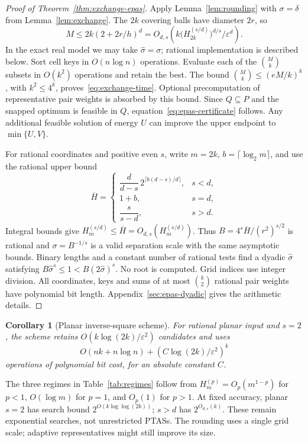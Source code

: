\documentclass[a4paper,12pt]{article}
\newtheorem{corollary}[theorem]{Corollary}
\numberwithin{equation}{section}
\begin{document}
\begin{proof}[Proof of Theorem~\ref{thm:exchange-epas}]
Apply Lemma~\ref{lem:rounding} with $\sigma=\delta$ from Lemma~\ref{lem:exchange}. The $2k$
covering balls have diameter $2r$, so
\[
 M\le2k(2+2r/h)^d
 =O_{d,s}\!\left(k\bigl(H_{2k}^{(s/d)}\bigr)^{d/s}/\varepsilon^d\right).
\]
In the exact real model we may take $\widehat\sigma=\sigma$; rational implementation is described
below. Sort cell keys in $O(n\log n)$ operations. Evaluate each of the $\binom Mk$ subsets in
$O(k^2)$ operations and retain the best. The bound $\binom Mk\le(eM/k)^k$, with $k^2\le4^k$,
proves~\eqref{eq:exchange-time}. Optional precomputation of representative pair weights is
absorbed by this bound. Since $Q\subseteq P$ and the snapped optimum is feasible in $Q$,
equation~\eqref{eq:epas-certificate} follows. Any additional feasible solution of energy $U$ can
improve the upper endpoint to $\min\{U,V\}$.

For rational coordinates and positive even $s$, write $m=2k$, $b=\lceil\log_2m\rceil$, and use the rational upper bound
\begin{equation}\label{eq:h-surrogate}
 \overline H=
 \begin{cases}
 \dfrac{d}{d-s}\,2^{\lceil b(d-s)/d\rceil},&s<d,\\
 1+b,&s=d,\\
 \dfrac{s}{s-d},&s>d.
 \end{cases}
\end{equation}
Integral bounds give $H_m^{(s/d)}\le\overline H=O_{d,s}(H_m^{(s/d)})$. Thus $B=4^s\overline
H/(r^2)^{s/2}$ is rational and $\sigma=B^{-1/s}$ is a valid separation scale with the same
asymptotic bounds. Binary lengths and a constant number of rational tests find a dyadic
$\widehat\sigma$ satisfying $B\widehat\sigma^s\le1<B(2\widehat\sigma)^s$. No root is computed.
Grid indices use integer division. All coordinates, keys and sums of at most $\binom{k}{2}$
rational pair weights have polynomial bit length. Appendix~\ref{sec:epas-dyadic} gives the
arithmetic details.
\end{proof}

\begin{corollary}[Planar inverse-square scheme]\label{thm:k-epas}
For rational planar input and $s=2$, the scheme retains $O(k\log(2k)/\varepsilon^2)$ candidates and uses
\[
 O(nk+n\log n)+(C\log(2k)/\varepsilon^2)^k
\]
operations of polynomial bit cost, for an absolute constant $C$.
\end{corollary}
The three regimes in Table~\ref{tab:regimes} follow from $H_m^{(p)}=O_p(m^{1-p})$ for $p<1$,
$O(\log m)$ for $p=1$, and $O_p(1)$ for $p>1$. At fixed accuracy, planar $s=2$ has search bound
$2^{O(k\log\log(2k))}$; $s>d$ has $2^{O_{d,s}(k)}$. These remain exponential searches, not
unrestricted PTASs. The rounding uses a single grid scale; adaptive representatives might still
improve its size.
\end{document}
